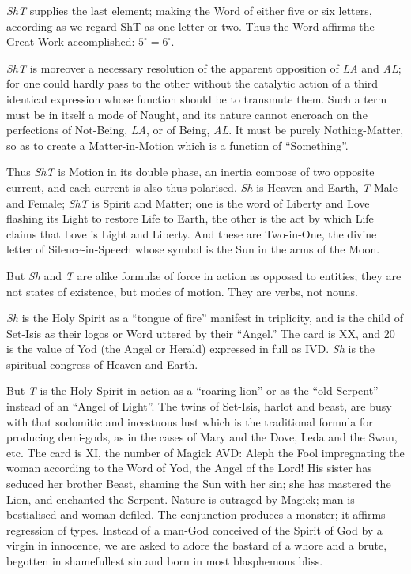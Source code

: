 \textit{ShT} supplies the last element; making the Word of either five or six letters, according as we regard ShT as one letter or two. Thus the Word affirms the Great Work accomplished: $5^{\circ}=6^{\square}$.

\textit{ShT} is moreover a necessary resolution of the apparent opposition of \textit{LA} and \textit{AL}; for one could hardly pass to the other without the catalytic action of a third identical expression whose function should be to transmute them. Such a term must be in itself a mode of Naught, and its nature cannot encroach on the perfections of Not-Being, \textit{LA}, or of Being, \textit{AL}. It must be purely Nothing-Matter, so as to create a Matter-in-Motion which is a function of \enquote{Something}.

Thus \textit{ShT} is Motion in its double phase, an inertia compose of two opposite current, and each current is also thus polarised. \textit{Sh} is Heaven and Earth, \textit{T} Male and Female; \textit{ShT} is Spirit and Matter; one is the word of Liberty and Love flashing its Light to restore Life to Earth, the other is the act by which Life claims that Love is Light and Liberty. And these are Two-in-One, the divine letter of Silence-in-Speech whose symbol is the Sun in the arms of the Moon.

But \textit{Sh} and \textit{T} are alike formul\ae{} of force in action as opposed to entities; they are not states of existence, but modes of motion. They are verbs, not nouns.

\textit{Sh} is the Holy Spirit as a \enquote{tongue of fire} manifest in triplicity, and is the child of Set-Isis as their logos or Word uttered by their \enquote{Angel.} The card is XX, and 20 is the value of Yod (the Angel or Herald) expressed in full as IVD. \textit{Sh} is the spiritual congress of Heaven and Earth.

But \textit{T} is the Holy Spirit in action as a \enquote{roaring lion} or as the \enquote{old Serpent} instead of an \enquote{Angel of Light}. The twins of Set-Isis, harlot and beast, are busy with that sodomitic and incestuous lust which is the traditional formula for producing demi-gods, as in the cases of Mary and the Dove, Leda and the Swan, etc. The card is XI, the number of Magick AVD: Aleph the Fool impregnating the woman according to the Word of Yod, the Angel of the Lord! His sister has seduced her brother Beast, shaming the Sun with her sin; she has mastered the Lion, and enchanted the Serpent. Nature is outraged by Magick; man is bestialised and woman defiled. The conjunction produces a monster; it affirms regression of types. Instead of a man-God conceived of the Spirit of God by a virgin in innocence, we are asked to adore the bastard of a whore and a brute, begotten in shamefullest sin and born in most blasphemous bliss.

